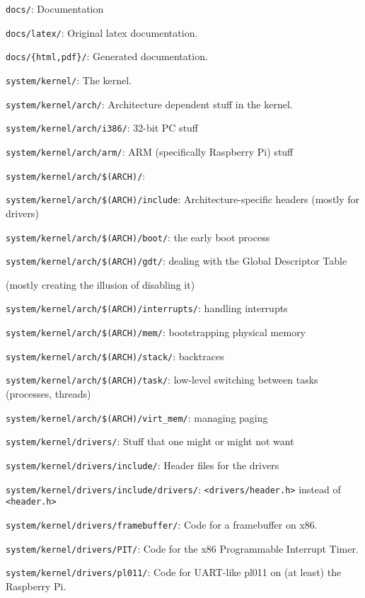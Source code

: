 \documentclass[12pt]{article}
\newcommand{\code}[1]{\colorbox{light-gray}{\texttt{#1}}}
\begin{document}
\begin{list}{}{}
\item \code{docs/}: Documentation
\item \code{docs/latex/}: Original latex documentation.
\item \code{docs/\{html,pdf\}/}: Generated documentation.
\item \code{system/kernel/}: The kernel.
\item \code{system/kernel/arch/}: Architecture dependent stuff in the kernel.
\item \code{system/kernel/arch/i386/}: 32-bit PC stuff
\item \code{system/kernel/arch/arm/}: ARM (specifically Raspberry Pi) stuff
\item \code{system/kernel/arch/\$(ARCH)/}:
\item \code{system/kernel/arch/\$(ARCH)/include}: Architecture-specific headers (mostly for drivers)
\item \code{system/kernel/arch/\$(ARCH)/boot/}: the early boot process
\item \code{system/kernel/arch/\$(ARCH)/gdt/}: dealing with the Global Descriptor Table \begin{small}(mostly creating the illusion of disabling it)\end{small}
\item \code{system/kernel/arch/\$(ARCH)/interrupts/}: handling interrupts
\item \code{system/kernel/arch/\$(ARCH)/mem/}: bootstrapping physical memory
\item \code{system/kernel/arch/\$(ARCH)/stack/}: backtraces
\item \code{system/kernel/arch/\$(ARCH)/task/}: low-level switching between tasks (processes, threads)
\item \code{system/kernel/arch/\$(ARCH)/virt\_mem/}: managing paging
\item \code{system/kernel/drivers/}: Stuff that one might or might not want
\item \code{system/kernel/drivers/include/}: Header files for the drivers
\item \code{system/kernel/drivers/include/drivers/}: \code{<drivers/header.h>} instead of \code{<header.h>}
\item \code{system/kernel/drivers/framebuffer/}: Code for a framebuffer on x86.
\item \code{system/kernel/drivers/PIT/}: Code for the x86 Programmable Interrupt Timer.
\item \code{system/kernel/drivers/pl011/}: Code for UART-like pl011 on (at least) the Raspberry Pi.

\end{list}
\end{document}
